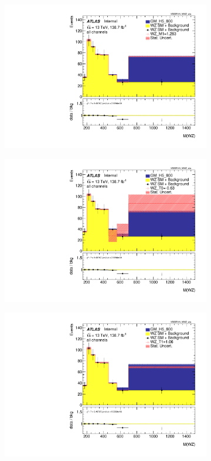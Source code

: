 \documentclass[../Bachelorarbeit.tex]{subfiles}
\begin{document}
\begin{figure}
\begin{subfigure}{0.3\textwidth}
        \includegraphics[width=\textwidth]{Plots/ALL_MWZ_final/GM_H5_800/M1/2022-04-21/VBSSR/all_VV_MWZ_vbs.pdf}
    \end{subfigure}
    \begin{subfigure}{0.3\textwidth}
        \includegraphics[width=\textwidth]{Plots/ALL_MWZ_final/GM_H5_800/T0/2022-04-21/VBSSR/all_VV_MWZ_vbs.pdf}
    \end{subfigure}
    \begin{subfigure}{0.3\textwidth}
        \includegraphics[width=\textwidth]{Plots/ALL_MWZ_final/GM_H5_800/T1/2022-04-21/VBSSR/all_VV_MWZ_vbs.pdf}

\end{subfigure}
\end{figure}
\end{document}
